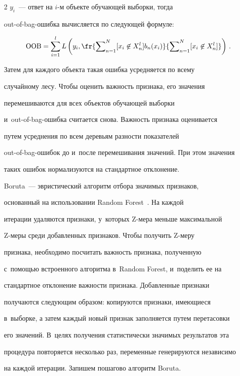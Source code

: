 \begin{multicols}{2}
$y_i$~--- ответ на $i$-м объекте обучающей выборки, тогда  

out-of-bag-ошиб\-ка вычисляется по следующей формуле:

  $$

  \mathrm{OOB}=\sum\limits^l_{i=1} L\left( y_i, \fr{\sum\nolimits^N_{n=1} [x_i\not\in 

X^l_n] b_n(x_i)} {\sum\nolimits^N_{n=1} [x_i\not\in X^l_n]}\right)\,.

  $$

  

  Затем для каждого объекта такая ошибка усредняется по всему 

случайному лесу. Чтобы оценить важность признака, его значения 

перемешиваются для всех объектов обучающей выборки  

и~out-of-bag-ошиб\-ка считается снова. Важность признака оценивается 

путем усреднения по всем деревьям разности показателей  

out-of-bag-оши\-бок до и~после перемешивания значений. При этом значения 

таких ошибок нормализуются на стандартное отклонение. 

  

  Boruta~--- эвристический алгоритм отбора значимых признаков, 

основанный на использовании Random Forest~\cite{4-sev}. На каждой 

итерации удаляются признаки, у~которых Z-ме\-ра меньше максимальной  

Z-ме\-ры среди добавленных признаков. Чтобы получить Z-ме\-ру 

признака, необходимо посчитать важность признака, полученную  

с~по\-мощью встроенного алгоритма в~Random Forest, и~поделить ее на 

стандартное отклонение важности признака. Добавленные признаки 

получаются следующим образом: копируются признаки, имеющиеся 

в~выборке, а затем каждый новый признак заполняется путем перетасовки 

его значений. В~целях получения статистически значимых результатов эта 

процедура повторяется несколько раз, переменные генерируются независимо 

на каждой итерации. Запишем пошагово алгоритм Boruta.


\end{multicols}
